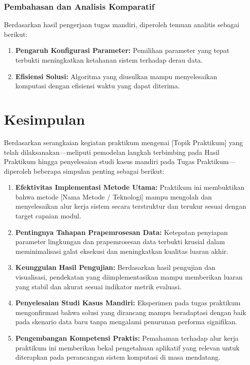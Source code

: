 \documentclass[a4paper,oneside,11pt]{book}
\begin{document}
\subsection{Pembahasan dan Analisis Komparatif}
Berdasarkan hasil pengerjaan tugas mandiri, diperoleh temuan analitis sebagai berikut:
\begin{enumerate}
    \item \textbf{Pengaruh Konfigurasi Parameter:} Pemilihan parameter yang tepat terbukti meningkatkan ketahanan sistem terhadap derau data.
    \item \textbf{Efisiensi Solusi:} Algoritma yang diusulkan mampu menyelesaikan komputasi dengan efisiensi waktu yang dapat diterima.
\end{enumerate}

\chapter{Kesimpulan}
\label{chap:kesimpulan}

Berdasarkan serangkaian kegiatan praktikum mengenai [Topik Praktikum] yang telah dilaksanakan—meliputi pemodelan langkah terbimbing pada Hasil Praktikum hingga penyelesaian studi kasus mandiri pada Tugas Praktikum—diperoleh beberapa simpulan penting sebagai berikut:

\begin{enumerate}
    \item \textbf{Efektivitas Implementasi Metode Utama:} Praktikum ini membuktikan bahwa metode [Nama Metode / Teknologi] mampu mengolah dan menyelesaikan alur kerja sistem secara terstruktur dan terukur sesuai dengan target capaian modul.
    
    \item \textbf{Pentingnya Tahapan Prapemrosesan Data:} Ketepatan penyiapan parameter lingkungan dan prapemrosesan data terbukti krusial dalam meminimalisasi galat eksekusi dan meningkatkan kualitas luaran akhir.
    
    \item \textbf{Keunggulan Hasil Pengujian:} Berdasarkan hasil pengujian dan visualisasi, pendekatan yang diimplementasikan mampu memberikan luaran yang stabil dan akurat sesuai indikator metrik evaluasi.
    
    \item \textbf{Penyelesaian Studi Kasus Mandiri:} Eksperimen pada tugas praktikum mengonfirmasi bahwa solusi yang dirancang mampu beradaptasi dengan baik pada skenario data baru tanpa mengalami penurunan performa signifikan.
    
    \item \textbf{Pengembangan Kompetensi Praktis:} Pemahaman terhadap alur kerja praktikum ini memberikan bekal pengetahuan aplikatif yang relevan untuk diterapkan pada perancangan sistem komputasi di masa mendatang.
\end{enumerate}
\end{document}
